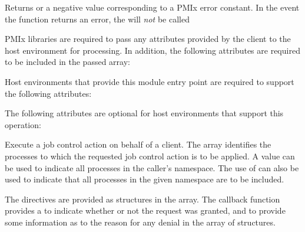 Returns  or a negative value corresponding to a PMIx error constant. In the event the function returns an error, the  will \textit{not} be called

\reqattrstart
\ac{PMIx} libraries are required to pass any attributes provided by the client to the host environment for processing. In addition, the following attributes are required to be included in the passed  array:


Host environments that provide this module entry point are required to support the following attributes:


\reqattrend

\optattrstart
The following attributes are optional for host environments that support this operation:


\optattrend

\descr

Execute a job control action on behalf of a client. The  array identifies the processes to which the requested job control action is to be applied.
A  value can be used to indicate all processes in the caller's namespace.
The use of  can also be used to indicate that all processes in the given namespace are to be included.

The directives are provided as  structures in the  array.
The callback function provides a  to indicate whether or not the request was granted, and to provide some information as to the reason for any denial in the  array of  structures.


